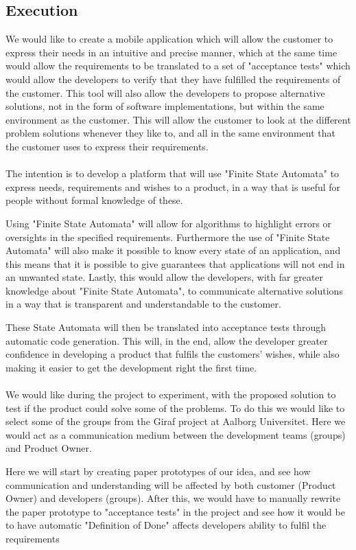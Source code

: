 \subsection{Execution}
We would like to create a mobile application which will allow the customer to express their needs in an intuitive and precise manner, which at the same time would allow the requirements to be translated to a set of "acceptance tests" which would allow the developers to verify that they have fulfilled the requirements of the customer.
This tool will also allow the developers to propose alternative solutions, not in the form of software implementations, but within the same environment as the customer. 
This will allow the customer to look at the different problem solutions whenever they like to, and all in the same environment that the customer uses to express their requirements. 
\\\\
The intention is to develop a platform that will use "Finite State Automata" to express needs, requirements and wishes to a product, in a way that is useful for people without formal knowledge of these. 

Using "Finite State Automata" will allow for algorithms to highlight errors or oversights in the specified requirements.
Furthermore the use of "Finite State Automata" will also make it possible to know every state of an application, and this means that it is possible to give guarantees that applications will not end in an unwanted state. 
Lastly, this would allow the developers, with far greater knowledge about "Finite State Automata", to communicate alternative solutions in a way that is transparent and understandable to the customer. 

These State Automata will then be translated into acceptance tests through automatic code generation.
This will, in the end, allow the developer greater confidence in developing a product that fulfils the customers' wishes, while also making it easier to get the development right the first time.
\\\\
We would like during the project to experiment, with the proposed solution to test if the product could solve some of the problems.
To do this we would like to select some of the groups from the Giraf project at Aalborg Universitet. 
Here we would act as a communication medium between the development teams (groups) and Product Owner.

Here we will start by creating paper prototypes of our idea, and see how communication and understanding will be affected by both customer (Product Owner) and developers (groups).
After this, we would have to manually rewrite the paper prototype to "acceptance tests" in the project and see how it would be to have automatic "Definition of Done" affects developers ability to fulfil the requirements

